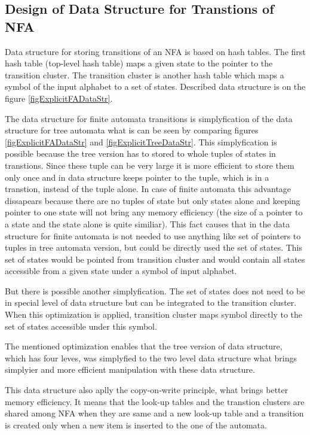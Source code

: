 \subsection{Design of Data Structure for Transtions of NFA}
Data structure for storing transitions of an NFA is based on hash tables. The first hash table (top-level hash table) maps a given state to the pointer to
the transition cluster. The transition cluster is another hash table which maps a symbol of the input alphabet to a set of states. Described data structure is on
the figure \ref{figExplicitFADataStr}.

The data structure for finite automata transitions is simplyfication of the data structure for tree automata what is can be seen by comparing figures 
\ref{figExplicitFADataStr} and \ref{figExplicitTreeDataStr}. This simplyfication is possible because the tree version has to stored to whole tuples of
states in transtions. Since these tuple can be very large it is more efficient to store them only once and in data structure keeps pointer to the 
tuple, which is in a transtion, instead of the tuple alone. 
In case of finite automata this advantage dissapears because there are no tuples of state but only states alone and keeping pointer to one state will not 
bring any memory efficiency (the size of a pointer to a state and the state alone is quite similiar). This fact causes that in the data structure 
for finite automata is not needed to use anything like set of pointers to tuples in tree automata version, but could be directly used the set of states. This 
set of states would be pointed from transition cluster and would contain all states accessible from a given state under a symbol of input alphabet.

But there is possible another simplyfication. The set of states does not need to be in special level of data structure but can be integrated to the transition
cluster. When this optimization is applied, transition cluster maps symbol directly to the set of states accessible under this symbol.

The mentioned optimization enables that the tree version of data structure, which has four leves, was simplyfied to the two level data structure what brings
simplyier and more efficient manipulation with these data structure.

This data structure also aplly the copy-on-write principle, what brings better memory efficiency. It means that the look-up tables and 
the transtion clusters are shared among NFA when they are same and
a new look-up table and a transition is created only when a new item is inserted to the one of the automata.

